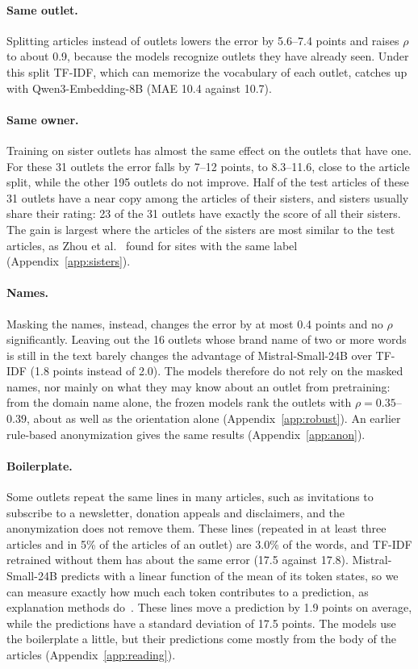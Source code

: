 \documentclass[11pt,a4paper]{article}
\begin{document}
\paragraph{Same outlet.} Splitting articles instead of outlets lowers the error by 5.6--7.4 points and raises $\rho$ to
about 0.9, because the models recognize outlets they have already seen. Under this split TF-IDF, which can memorize the
vocabulary of each outlet, catches up with Qwen3-Embedding-8B (MAE 10.4 against 10.7).

\paragraph{Same owner.} Training on sister outlets has almost the same effect on the outlets that have one. For these 31
outlets the error falls by 7--12 points, to 8.3--11.6, close to the article split, while the other 195 outlets do not
improve. Half of the test articles of these 31 outlets have a near copy among the articles of their sisters, and sisters
usually share their rating: 23 of the 31 outlets have exactly the score of all their sisters. The gain is largest where
the articles of the sisters are most similar to the test articles, as Zhou et al.~\cite{zhou2021hidden} found for sites
with the same label (Appendix~\ref{app:sisters}).

\paragraph{Names.} Masking the names, instead, changes the error by at most 0.4 points and no $\rho$ significantly.
Leaving out the 16 outlets whose brand name of two or more words is still in the text barely changes the advantage of
Mistral-Small-24B over TF-IDF (1.8 points instead of 2.0). The models therefore do not rely on the masked names, nor
mainly on what they may know about an outlet from pretraining: from the domain name alone, the frozen models rank the
outlets with $\rho = 0.35$--$0.39$, about as well as the orientation alone (Appendix~\ref{app:robust}). An
earlier rule-based anonymization gives the same results (Appendix~\ref{app:anon}).

\paragraph{Boilerplate.} Some outlets repeat the same lines in many articles, such as invitations to subscribe to a
newsletter, donation appeals and disclaimers, and the anonymization does not remove them. These lines (repeated in at
least three articles and in 5\% of the articles of an outlet) are 3.0\% of the words, and TF-IDF retrained without them
has about the same error (17.5 against 17.8). Mistral-Small-24B predicts with a linear function of the mean of its token
states, so we can measure exactly how much each token contributes to a prediction, as explanation methods
do~\cite{kozik2024explainability}. These lines move a prediction by 1.9 points on average, while the predictions have a
standard deviation of 17.5 points. The models use the boilerplate a little, but their predictions come mostly from the
body of the articles (Appendix~\ref{app:reading}).
\end{document}
